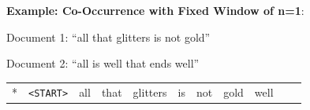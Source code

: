 \documentclass[11pt]{article}
\begin{document}
\textbf{Example: Co-Occurrence with Fixed Window of n=1}:

Document 1: ``all that glitters is not gold''

Document 2: ``all is well that ends well''

\begin{longtable}[]{@{}
  >{\raggedright\arraybackslash}p{}
  >{\raggedright\arraybackslash}p{}
  >{\raggedright\arraybackslash}p{}
  >{\raggedright\arraybackslash}p{}
  >{\raggedright\arraybackslash}p{}
  >{\raggedright\arraybackslash}p{}
  >{\raggedright\arraybackslash}p{}
  >{\raggedright\arraybackslash}p{}
  >{\raggedright\arraybackslash}p{}
  >{\raggedright\arraybackslash}p{}
  >{\raggedright\arraybackslash}p{}@{}}
\toprule\noalign{}
\begin{minipage}[b]{\linewidth}\raggedright
*
\end{minipage} & \begin{minipage}[b]{\linewidth}\raggedright
\texttt{\textless{}START\textgreater{}}
\end{minipage} & \begin{minipage}[b]{\linewidth}\raggedright
all
\end{minipage} & \begin{minipage}[b]{\linewidth}\raggedright
that
\end{minipage} & \begin{minipage}[b]{\linewidth}\raggedright
glitters
\end{minipage} & \begin{minipage}[b]{\linewidth}\raggedright
is
\end{minipage} & \begin{minipage}[b]{\linewidth}\raggedright
not
\end{minipage} & \begin{minipage}[b]{\linewidth}\raggedright
gold
\end{minipage} & \begin{minipage}[b]{\linewidth}\raggedright
well
\end{minipage} & \begin{minipage}[b]{\linewidth}\raggedright

\end{minipage}
\end{longtable}
\end{document}
